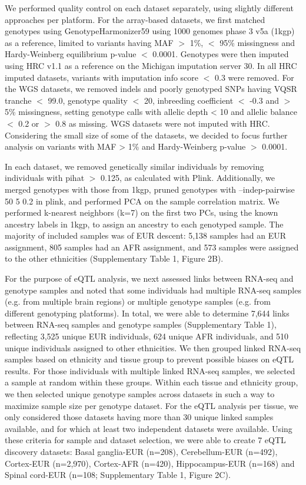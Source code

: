 We performed quality control on each dataset separately, using slightly different approaches per platform. For the array-based datasets, we first matched genotypes using GenotypeHarmonizer59 using 1000 genomes phase 3 v5a (1kgp) as a reference, limited to variants having MAF $>$ 1\%, $<$ 95\% missingness and Hardy-Weinberg equilibrium p-value $<$ 0.0001. Genotypes were then imputed using HRC v1.1 as a reference on the Michigan imputation server 30. In all HRC imputed datasets, variants with imputation info score $<$ 0.3 were removed. For the WGS datasets, we removed indels and poorly genotyped SNPs having VQSR tranche $<$ 99.0, genotype quality $<$ 20, inbreeding coefficient $<$ -0.3 and $>$ 5\% missingness, setting genotype calls with allelic depth < 10 and allelic balance $<$ 0.2 or $>$ 0.8 as missing. WGS datasets were not imputed with HRC. Considering the small size of some of the datasets, we decided to focus further analysis on variants with MAF > 1\% and Hardy-Weinberg p-value $>$ 0.0001. 

In each dataset, we removed genetically similar individuals by removing individuals with pihat $>$ 0.125, as calculated with Plink. Additionally, we merged genotypes with those from 1kgp, pruned genotypes with --indep-pairwise 50 5 0.2 in plink, and performed PCA on the sample correlation matrix. We performed k-nearest neighbors (k=7) on the first two PCs, using the known ancestry labels in 1kgp, to assign an ancestry to each genotyped sample. The majority of included samples was of EUR descent: 5,138 samples had an EUR assignment, 805 samples had an AFR assignment, and 573 samples were assigned to the other ethnicities (Supplementary Table 1, Figure 2B). 

For the purpose of eQTL analysis, we next assessed links between RNA-seq and genotype samples and noted that some individuals had multiple RNA-seq samples (e.g. from multiple brain regions) or multiple genotype samples (e.g. from different genotyping platforms). In total, we were able to determine 7,644 links between RNA-seq samples and genotype samples (Supplementary Table 1), reflecting 3,525 unique EUR individuals, 624 unique AFR individuals, and 510 unique individuals assigned to other ethnicities. We then grouped linked RNA-seq samples based on ethnicity and tissue group to prevent possible biases on eQTL results. For those individuals with multiple linked RNA-seq samples, we selected a sample at random within these groups. Within each tissue and ethnicity group, we then selected unique genotype samples across datasets in such a way to maximize sample size per genotype dataset. For the eQTL analysis per tissue, we only considered those datasets having more than 30 unique linked samples available, and for which at least two independent datasets were available. Using these criteria for sample and dataset selection, we were able to create 7 eQTL discovery datasets: Basal ganglia-EUR (n=208), Cerebellum-EUR (n=492), Cortex-EUR (n=2,970), Cortex-AFR (n=420), Hippocampus-EUR (n=168) and Spinal cord-EUR (n=108; Supplementary Table 1, Figure 2C). 

